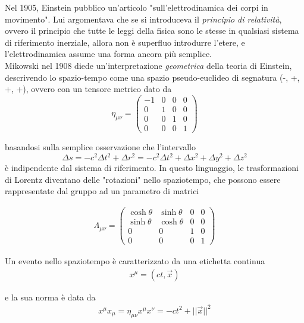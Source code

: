 \documentclass{report}
\begin{document}
Nel 1905, Einstein pubblico un'articolo "sull'elettrodinamica dei corpi in movimento". Lui argomentava che se si introduceva il \emph{principio di relatività}, ovvero il principio che tutte le leggi della fisica sono le stesse in qualsiasi sistema di riferimento inerziale, allora non è superfluo introdurre l'etere, e l'elettrodinamica assume una forma ancora più semplice. \\

Mikowski nel 1908 diede un'interpretazione \emph{geometrica} della teoria di Einstein, descrivendo lo spazio-tempo come una spazio pseudo-euclideo di segnatura (-, +, +, +), ovvero con un tensore metrico dato da 
\begin{equation}
    \eta_{\mu \nu} = \begin{pmatrix}
        -1 & 0 & 0 & 0 \\ 0 & 1 & 0 & 0 \\ 0 & 0 & 1  & 0 \\ 0 & 0 & 0 & 1
    \end{pmatrix}
\end{equation}

basandosi sulla semplice osservazione che l'intervallo 
\begin{equation}
    \Delta s = -c^2\Delta t^2 + \Delta r^2 = -c^2\Delta t^2 + \Delta x^2 + \Delta y^2 + \Delta z^2
\end{equation}
è indipendente dal sistema di riferimento. In questo linguaggio, le trasformazioni di Lorentz diventano delle "rotazioni" nello spaziotempo, che possono essere rappresentate dal gruppo ad un parametro di matrici 

\begin{align}
    \Lambda_{\mu \nu} = \begin{pmatrix}
        \cosh \theta & \sinh \theta & 0 & 0 \\
        \sinh \theta & \cosh \theta & 0 & 0 \\
        0 & 0 & 1 & 0 \\
        0 & 0 & 0 & 1
    \end{pmatrix}
\end{align}

Un evento nello spaziotempo è caratterizzato da una etichetta continua
\begin{align}
    x^{\mu} = (ct, \vec{x})
\end{align}

e la sua norma è data da 
\begin{align}
    x^{\mu}x_{\mu} = \eta_{\mu \nu}x^{\mu}x^{\nu} = -ct^2 + ||\vec{x}||^2
\end{align}
\end{document}
